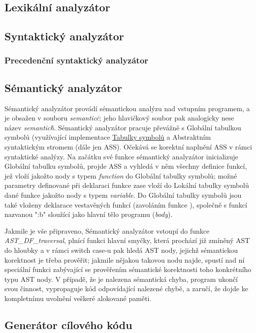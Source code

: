 \documentclass[a4paper, 11pt]{article}
\begin{document}
	\subsection{Lexikální analyzátor}
	\subsection{Syntaktický analyzátor}
	\subsubsection{Precedenční syntaktický analyzátor}
	\subsection{Sémantický analyzátor}
	\label{semantic}
	Sémantický analyzátor provádí sémantickou analýzu nad vstupním programem, a je obsažen v souboru \textit{semantic\.c}; jeho hlavičkový soubor pak 
	analogicky nese název \textit{semantic\.h}. Sémantický analyzátor pracuje převážně s Globální tabulkou symbolů (využívající implementace 
	\hyperref[symtab]{Tabulky symbolů} a Abstraktním syntaktickým stromem (dále jen ASS). Očekává se korektní naplnění ASS v rámci syntaktické analýzy. Na 
	začátku své funkce sémantický analyzátor inicializuje Globální tabulku symbolů, projde ASS a vyhledá v něm všechny definice funkcí, jež vloží jakožto nody s 
	typem \textit{function} do Globální tabulky symbolů; možné parametry definované při deklaraci funkce zase vloží do Lokální tabulky symbolů dané funkce 
	jakožto nody s typem \textit{variable}. Do Globální tabulky symbolů jsou také vloženy deklarace vestavěných funkcí (zavoláním funkce ), společně s funkcí 
	nazvanou ":b" sloužící jako hlavní tělo programu (\textit{body}).

	Jakmile je vše připraveno, Sémantický analyzátor vstoupí do funkce \textit{AST\_DF\_traversal}, plnící funkci hlavní smyčky, která prochází již zmíněný AST 
	do hloubky a v rámci switch case-u pak hledá AST nody, jejichž sémantickou korektnost je třeba prověřit; jakmile nějakou takovou nodu najde, spustí nad ní 
	speciální funkci zabývající se prověřením sémantické korektnosti toho konkrétního typu AST nody. V případě, že je nalezena sémantická chyba, program 
	ukončí svou činnost, vypropaguje kód odpovídající nalezené chybě, a zaručí, že dojde ke kompletnímu uvolnění veškeré alokované paměti.
	\subsection{Generátor cílového kódu}
\end{document}
